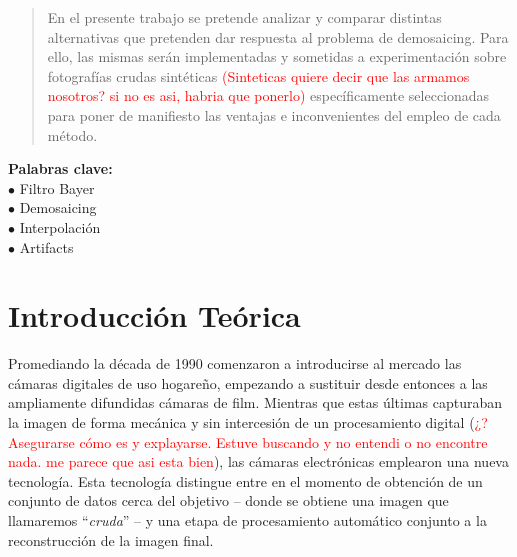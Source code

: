 \documentclass[a4paper]{article}
\begin{document}
\thispagestyle{empty}

\maketitle
\newpage

\thispagestyle{empty}
\vfill
\begin{abstract}
En el presente trabajo se pretende analizar y comparar distintas alternativas que pretenden dar respuesta al problema de demosaicing. Para ello, las mismas serán implementadas y sometidas a experimentación sobre fotografías crudas sintéticas \textcolor{red}{(Sinteticas quiere decir que las armamos nosotros? si no es asi, habria que ponerlo)} específicamente seleccionadas para poner de manifiesto las ventajas e inconvenientes del empleo de cada método. \\
\end{abstract}

\textbf{Palabras clave:} \\
$\bullet$ Filtro Bayer \\
$\bullet$ Demosaicing \\
$\bullet$ Interpolaci\'on \\
$\bullet$ Artifacts \\



\thispagestyle{empty}
\vspace{3cm}
\tableofcontents
\newpage


\newpage

\section{Introducci\'on Te\'orica}

Promediando la década de 1990 comenzaron a introducirse al mercado las cámaras digitales de uso hogareño, empezando a sustituir desde entonces a las ampliamente difundidas cámaras de film. 
Mientras que estas últimas capturaban la imagen de forma mecánica y sin intercesión de un procesamiento digital (\textcolor{red}{¿? Asegurarse cómo es y explayarse. Estuve buscando y no entendi o no encontre nada. me parece que asi esta bien}), las cámaras electrónicas emplearon una nueva tecnología. Esta tecnolog\'ia distingue entre en el momento de obtención de un conjunto de datos cerca del objetivo – donde se obtiene una imagen que llamaremos “\textit{cruda}” – y una etapa de procesamiento automático conjunto a la reconstrucción de la imagen final. \\
\end{document}
